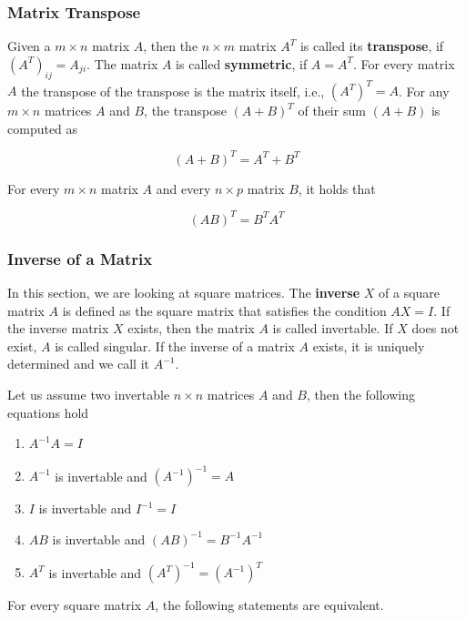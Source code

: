 \documentclass[
]{book}
\providecommand{\tightlist}{%
  \setlength{\itemsep}{0pt}\setlength{\parskip}{0pt}}
\theoremstyle{definition}
\theoremstyle{definition}
\theoremstyle{definition}
\theoremstyle{remark}
\begin{document}
\hypertarget{intro-linalg-laws-matrix-transpose}{%
\subsubsection{Matrix Transpose}\label{intro-linalg-laws-matrix-transpose}}

Given a \(m\times n\) matrix \(A\), then the \(n\times m\) matrix \(A^T\) is called its \textbf{transpose}, if \((A^T)_{ij} = A_{ji}\). The matrix \(A\) is called \textbf{symmetric}, if \(A = A^T\). For every matrix \(A\) the transpose of the transpose is the matrix itself, i.e., \((A^T)^T = A\). For any \(m\times n\) matrices \(A\) and \(B\), the transpose \((A+B)^T\) of their sum \((A+B)\) is computed as

\[(A+B)^T = A^T + B^T\]

For every \(m\times n\) matrix \(A\) and every \(n\times p\) matrix \(B\), it holds that

\[(AB)^T = B^T A^T\]

\hypertarget{intro-linalg-inverse-matrix}{%
\subsubsection{Inverse of a Matrix}\label{intro-linalg-inverse-matrix}}

In this section, we are looking at square matrices. The \textbf{inverse} \(X\) of a square matrix \(A\) is defined as the square matrix that satisfies the condition \(AX = I\). If the inverse matrix \(X\) exists, then the matrix \(A\) is called invertable. If \(X\) does not exist, \(A\) is called singular. If the inverse of a matrix \(A\) exists, it is uniquely determined and we call it \(A^{-1}\).

Let us assume two invertable \(n\times n\) matrices \(A\) and \(B\), then the following equations hold

\begin{enumerate}
\def\labelenumi{\arabic{enumi}.}
\tightlist
\item
  \(A^{-1}A = I\)
\item
  \(A^{-1}\) is invertable and \((A^{-1})^{-1} = A\)
\item
  \(I\) is invertable and \(I^{-1} = I\)
\item
  \(AB\) is invertable and \((AB)^{-1} = B^{-1}A^{-1}\)
\item
  \(A^T\) is invertable and \((A^T)^{-1} = (A^{-1})^T\)
\end{enumerate}

For every square matrix \(A\), the following statements are equivalent.
\end{document}
